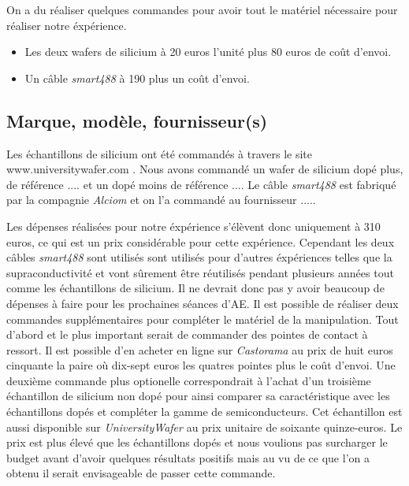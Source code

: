 \bigskip
On a du réaliser quelques commandes pour avoir tout le matériel nécessaire pour réaliser notre éxpérience.

\begin{itemize}
  \item Les deux wafers de silicium à 20 euros l'unité plus 80 euros de coût d'envoi.
  \item Un câble \emph{smart488} à 190 plus un coût d'envoi.
\end{itemize}

\subsection{Marque, modèle, fournisseur(s)}
Les échantillons de silicium ont été commandés à travers le site www.universitywafer.com . Nous avons commandé un wafer de silicium dopé plus, de référence .... et un dopé moins de référence ....
Le câble \emph{smart488} est fabriqué par la compagnie \emph{Alciom} et on l'a commandé au fournisseur .....

Les dépenses réalisées pour notre éxpérience s'élèvent donc uniquement à 310 euros, ce qui est un prix considérable pour cette expérience. Cependant les deux câbles \emph{smart488} sont utilisés sont utilisés pour d'autres éxpériences telles que la supraconductivité et vont sûrement être réutilisés pendant plusieurs années tout comme les échantillons de silicium. Il ne devrait donc pas y avoir beaucoup de dépenses à faire pour les prochaines séances d'AE.
Il est possible de réaliser deux commandes supplémentaires pour compléter le matériel de la manipulation.
Tout d'abord et le plus important serait de commander des pointes de contact à ressort. Il est possible d'en acheter en ligne sur \emph{Castorama} au prix de huit euros cinquante la paire où dix-sept euros les quatres pointes plus le coût d'envoi.
Une deuxième commande plus optionelle correspondrait à l'achat d'un troisième échantillon de silicium non dopé pour ainsi comparer sa caractéristique avec les échantillons dopés et compléter la gamme de semiconducteurs. Cet échantillon est aussi disponible sur \emph{UniversityWafer} au prix unitaire de soixante quinze-euros. Le prix est plus élevé que les échantillons dopés et nous voulions pas surcharger le budget avant d'avoir quelques résultats positifs mais au vu de ce que l'on a obtenu il serait envisageable de passer cette commande.
